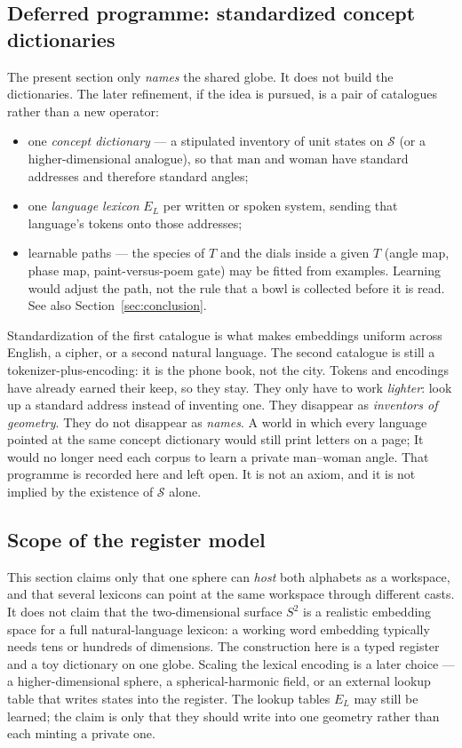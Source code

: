 \documentclass[12pt, a4paper]{article}
\begin{document}
\subsection{Deferred programme: standardized concept dictionaries}
\label{subsec:standard_dictionaries}
The present section only \emph{names} the shared globe. It does not
build the dictionaries. The later refinement, if the idea is pursued,
is a pair of catalogues rather than a new operator:
\begin{itemize}
    \item one \emph{concept dictionary} --- a stipulated inventory of
          unit states on $\mathcal{S}$ (or a higher-dimensional
          analogue), so that $\mathrm{man}$ and $\mathrm{woman}$ have
          standard addresses and therefore standard angles;
    \item one \emph{language lexicon} $E_L$ per written or spoken
          system, sending that language's tokens onto those addresses;
    \item learnable paths --- the species of $T$ and the dials inside
          a given $T$ (angle map, phase map, paint-versus-poem gate)
          may be fitted from examples. Learning would adjust the path,
          not the rule that a bowl is collected before it is read.
          See also Section~\ref{sec:conclusion}.
\end{itemize}
Standardization of the first catalogue is what makes embeddings
uniform across English, a cipher, or a second natural language.
The second catalogue is still a tokenizer-plus-encoding: it is the
phone book, not the city. Tokens and encodings have already earned
their keep, so they stay. They only have to work \emph{lighter}:
look up a standard address instead of inventing one. They disappear as
\emph{inventors of geometry}. They do not disappear as \emph{names}.
A world in which every language pointed at the same concept
dictionary would still print letters on a page; It would no longer need each 
corpus to learn a private $\mathrm{man}$--$\mathrm{woman}$ angle. 
That programme is recorded here and left open. It is not an
axiom, and it is not implied by the existence of $\mathcal{S}$ alone.

\subsection{Scope of the register model}
\label{subsec:register_scope_final}
This section claims only that one sphere can \emph{host} both alphabets
as a workspace, and that several lexicons can point at the same
workspace through different casts. It does not claim that the two-dimensional surface
$S^2$ is a realistic embedding space for a full natural-language
lexicon: a working word embedding typically needs tens or hundreds of
dimensions. The construction here is a typed register and a toy
dictionary on one globe. Scaling the lexical encoding is a later
choice --- a higher-dimensional sphere, a spherical-harmonic field, or
an external lookup table that writes states into the register. The
lookup tables $E_L$ may still be learned; the claim is only that they
should write into one geometry rather than each minting a private one.
\end{document}
